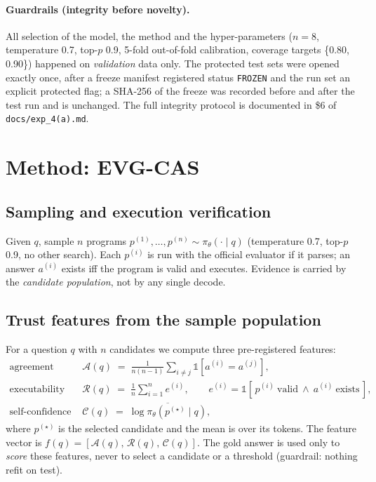 \documentclass[10pt]{article}
\newcommand{\ourmethod}{EVG-CAS}
\begin{document}
\paragraph{Guardrails (integrity before novelty).} All selection of the model, the method
and the hyper-parameters ($n=8$, temperature 0.7, top-$p$ 0.9, 5-fold out-of-fold
calibration, coverage targets \{0.80, 0.90\}) happened on \emph{validation} data only. The
protected test sets were opened exactly once, after a freeze manifest registered status
\texttt{FROZEN} and the run set an explicit protected flag; a SHA-256 of the freeze was
recorded before and after the test run and is unchanged. The full integrity protocol is
documented in \$6 of \texttt{docs/exp\_4(a).md}.

\section{Method: \ourmethod{}}\label{sec:method}

\subsection{Sampling and execution verification}
Given $q$, sample $n$ programs $p^{(1)},\dots,p^{(n)}\sim\pi_{\theta}(\cdot\mid q)$
(temperature 0.7, top-$p$ 0.9, no other search). Each $p^{(i)}$ is run with the official
evaluator if it parses; an answer $a^{(i)}$ exists iff the program is valid and executes.
Evidence is carried by the \emph{candidate population}, not by any single decode.

\subsection{Trust features from the sample population}
For a question $q$ with $n$ candidates we compute three pre-registered features:
\begin{align}
  \text{agreement} \quad &\mathcal{A}(q) \;=\; \frac{1}{n(n-1)}\sum_{i\neq j}
    \mathbb{1}[a^{(i)} = a^{(j)}],\\
  \text{executability} \quad &\mathcal{R}(q) \;=\; \frac{1}{n}\sum_{i=1}^{n}
    e^{(i)}, \qquad e^{(i)} = \mathbb{1}[\,p^{(i)}\ \text{valid}\ \wedge\ a^{(i)}\ \text{exists}\,],\\
  \text{self-confidence} \quad &\mathcal{C}(q) \;=\; \overline{\log\pi_{\theta}(p^{(\star)}\mid q)},
\end{align}
where $p^{(\star)}$ is the selected candidate and the mean is over its tokens.
The feature vector is $f(q)=[\mathcal{A}(q),\,\mathcal{R}(q),\,\mathcal{C}(q)]$. The gold
answer is used only to \emph{score} these features, never to select a candidate or a
threshold (guardrail: nothing refit on test).
\end{document}
